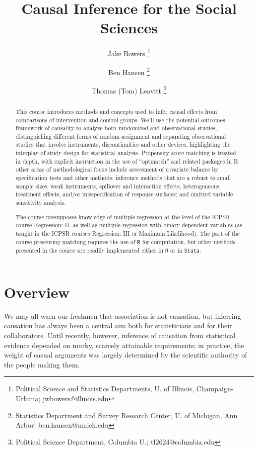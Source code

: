 \documentclass[12pt]{article}
\title{Causal Inference for the Social Sciences}
\author{ Jake Bowers \thanks{Political Science and Statistics
    Departments, U. of Illinois, Champaign-Urbana; jwbowers@illinois.edu}
\and Ben Hansen \thanks{Statistics Department and Survey Research Center, U. of Michigan, Ann Arbor; ben.hansen@umich.edu} \and Thomas (Tom)
Leavitt \thanks{Political Science Department, Columbia U.; \mbox{tl2624@columbia.edu}}}
\begin{document}
\maketitle
\begin{abstract}
\noindent This course introduces methods and concepts used to infer causal effects from comparisons of intervention and control groups.  We'll use the potential outcomes framework of causality to analyze both randomized and observational studies, distinguishing different forms of random assignment and separating observational studies that involve instruments, discontinuities and other devices, highlighting the interplay of study design for statistical analysis.  Propensity score matching is treated in depth, with explicit instruction in the use of ``optmatch'' and related packages in R; other areas of methodological focus include assessment of covariate balance by specification tests and other methods; inference methods that are a robust to small sample sizes, weak instruments, spillover and interaction effects, heterogeneous treatment effects, and/or misspecification of response surfaces; and omitted variable sensitivity analysis.  %

The course presupposes knowledge of multiple regression at the level
of the ICPSR course Regression: II, as well as multiple regression
with binary dependent variables (as taught in the ICPSR courses
Regression: III or Maximum Likelihood).  The part of the course presenting matching requires the use of \texttt{R} for computation, but other methods presented in the course are readily implemented either in \texttt{R} or in \texttt{Stata}.
\end{abstract}




\clearpage

\nobibliography*


\section*{Overview}

We may all warn our freshmen that association is not causation, but inferring causation has always been a central aim both for statisticians and for their collaborators. Until recently, however, inference of causation from statistical evidence depended on murky, scarcely attainable requirements; in practice, the weight of casual arguments was largely determined by the scientific authority of the people making them.
\end{document}

